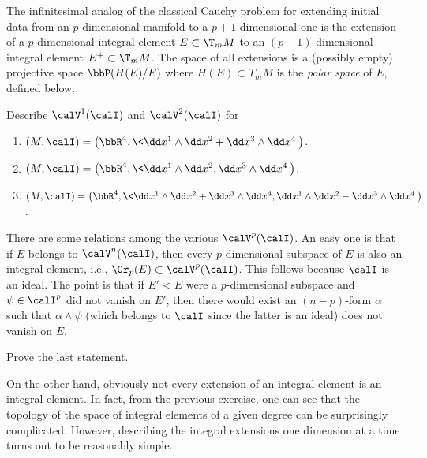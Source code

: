 The infinitesimal analog of the classical Cauchy problem for extending initial data from an $p$-dimensional manifold to a $p+1$-dimensional one is the extension of a $p$-dimensional integral element $E\subset \T_m M$ to an $(p+1)$-dimensional integral element $E^+\subset \T_m M$. The space of all extensions is a (possibly empty) projective space $\bbP(H(E)\slash E)$ where $H(E)\subset T_m M$ is the \emph{polar space} of $E$, defined below.

\begin{xca}\label{xca 3.3 Bryant lec}
    Describe $\calV^1(\calI)$ and $\calV^2(\calI)$ for 
    \begin{enumerate}
        \item $(M,\calI)=\left(\bbR^4,\<\dd x^1\wedge\dd x^2+\dd x^3\wedge\dd x^4\>\right)$.
        \item $(M,\calI)=\left(\bbR^4,\<\dd x^1\wedge\dd x^2,\dd x^3\wedge\dd x^4\>\right)$.
        \item $(M,\calI)=\left(\bbR^4,\<\dd x^1\wedge\dd x^2+\dd x^3\wedge\dd x^4,\dd x^1\wedge\dd x^2-\dd x^3\wedge\dd x^4\>\right)$.
    \end{enumerate}
\end{xca}

There are some relations among the various $\calV^p(\calI)$. An easy one is that if $E$ belongs to $\calV^n(\calI)$, then every $p$-dimensional subspace of $E$ is also an integral element, i.e., $\Gr_p(E)\subset \calV^p(\calI)$. This follows because $\calI$ is an ideal. The point is that if $E'<E$ were a $p$-dimensional subspace and $\psi\in\calI^p$ did not vanish on $E'$, then there would exist an $(n-p)$-form $\alpha$ such that $\alpha\wedge\psi$ (which belongs to $\calI$ since the latter is an ideal) does not vanish on $E$.

\begin{xca}
    Prove the last statement.
\end{xca}

On the other hand, obviously not every extension of an integral element is an integral element. In fact, from the previous exercise, one can see that the topology of the space of integral elements of a given degree can be surprisingly complicated. However, describing the integral extensions one dimension at a time turns out to be reasonably simple.

